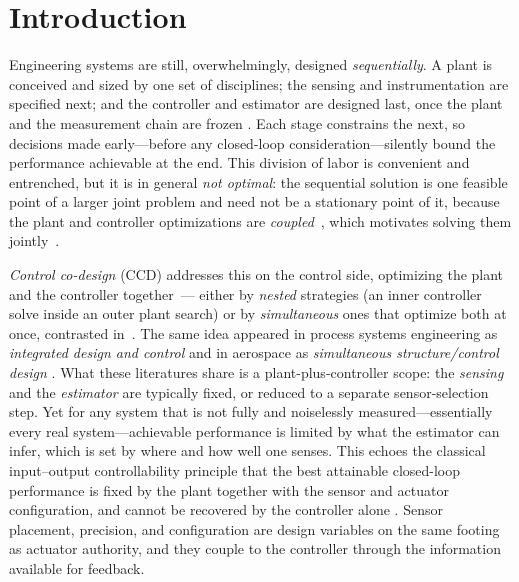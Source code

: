 \documentclass[twocolumn,amsthm]{autart}
\begin{document}
\section{Introduction}\label{sec:intro}

Engineering systems are still, overwhelmingly, designed \emph{sequentially}. A
plant is conceived and sized by one set of disciplines; the sensing and
instrumentation are specified next; and the controller and estimator are
designed last, once the plant and the measurement chain are frozen
\cite{garcia2019control}. Each stage constrains the next, so decisions made
early---before any closed-loop consideration---silently bound the performance
achievable at the end. This division of labor is convenient and entrenched, but
it is in general \emph{not optimal}: the sequential solution is one feasible
point of a larger joint problem and need not be a stationary point of it, because
the plant and controller optimizations are \emph{coupled}~\cite{fathy2001coupling},
which motivates solving them jointly~\cite{garcia2019control}.

\emph{Control co-design} (CCD) addresses this on the control side, optimizing the
plant and the controller together~\cite{garcia2019control,allison2014multidisciplinary}---%
either by \emph{nested} strategies (an inner controller solve inside an outer plant
search) or by \emph{simultaneous} ones that optimize both at once, contrasted
in~\cite{herber2019nested}. The same idea appeared in
process systems engineering as \emph{integrated design and control}
\cite{sakizlis2004recent,sharifzadeh2013integration} and in aerospace as
\emph{simultaneous structure/control design}
\cite{onoda1987approach,hale1985optimal}. What these literatures share is a
plant-plus-controller scope: the \emph{sensing} and the \emph{estimator} are
typically fixed, or reduced to a separate sensor-selection step. Yet for any
system that is not fully and noiselessly measured---essentially every real
system---achievable performance is limited by what the estimator can infer,
which is set by where and how well one senses. This echoes the classical
input--output controllability principle that the best attainable closed-loop
performance is fixed by the plant together with the sensor and actuator
configuration, and cannot be recovered by the controller alone
\cite{skogestad2005multivariable}. Sensor placement, precision, and
configuration are design variables on the same footing as actuator authority,
and they couple to the controller through the information available for
feedback.
\end{document}
